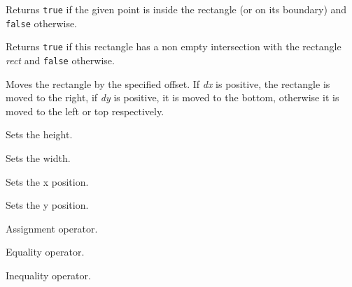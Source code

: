 \label{wxrectinside}



Returns {\tt true} if the given point is inside the rectangle (or on its
boundary) and {\tt false} otherwise.

\label{wxrectintersects}


Returns {\tt true} if this rectangle has a non empty intersection with the
rectangle {\it rect} and {\tt false} otherwise.

\label{wxrectoffset}



Moves the rectangle by the specified offset. If {\it dx} is positive, the
rectangle is moved to the right, if {\it dy} is positive, it is moved to the
bottom, otherwise it is moved to the left or top respectively.

\label{wxrectsetheight}


Sets the height.

\label{wxrectsetwidth}


Sets the width.

\label{wxrectsetx}


Sets the x position.

\label{wxrectsety}


Sets the y position.

\label{wxrectassign}


Assignment operator.

\label{wxrectequal}


Equality operator.

\label{wxrectnotequal}


Inequality operator.

